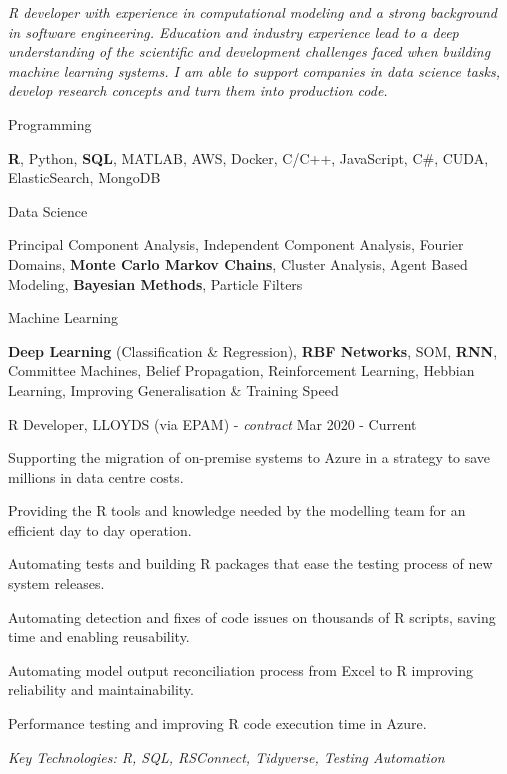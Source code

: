 \documentclass[11pt,article,oneside]{memoir}
\newenvironment{itemize*}{%
  \renewcommand\labelitemi{\textbullet}
  \footnotesize
  \begin{itemize}%
    \setlength{\itemsep}{0pt}}%
  {\end{itemize}
}
\begin{document}
\reversemarginpar

\medskip

\noindent\emph{R developer with experience in computational modeling and a strong background in software engineering.
Education and industry experience lead to a deep understanding of the scientific and development challenges faced when building machine learning systems.
I am able to support companies in data science tasks, develop research concepts and turn them into production code.
}
\bigskip


\ind Programming

\ind \hspace{0.354in} \footnotesize  \textbf{R}, Python, \textbf{SQL}, MATLAB, AWS, Docker, C/C++, JavaScript, C\#, CUDA, ElasticSearch, MongoDB \normalsize 

\ind Data Science

\ind \hspace{0.354in} \footnotesize Principal Component Analysis, Independent Component Analysis, Fourier Domains,
\textbf{Monte Carlo Markov Chains}, Cluster Analysis, Agent Based Modeling, \textbf{Bayesian Methods}, Particle Filters \normalsize

\ind Machine Learning 

\ind \hspace{0.354in} \footnotesize \textbf{Deep Learning} (Classification \& Regression), \textbf{RBF Networks}, SOM, \textbf{RNN}, Committee Machines,
Belief Propagation, Reinforcement Learning, Hebbian Learning, Improving Generalisation \& Training Speed \normalsize

\bigskip
 

\normalsize
\medskip
\ind R Developer, LLOYDS (via EPAM) - \emph{contract} \hfill Mar 2020 - Current
\begin{itemize*}
    \item Supporting the migration of on-premise systems to Azure in a strategy to save millions in data centre costs.
    \item Providing the R tools and knowledge needed by the modelling team for an efficient day to day operation.
    \item Automating tests and building R packages that ease the testing process of new system releases.
    \item Automating detection and fixes of code issues on thousands of R scripts, saving time and enabling reusability.
    \item Automating model output reconciliation process from Excel to R improving reliability and maintainability.  
    \item Performance testing and improving R code execution time in Azure.
\end{itemize*}
\ind \hspace{0.35in} \footnotesize \emph{Key Technologies: R, SQL, RSConnect, Tidyverse, Testing Automation}
\end{document}
